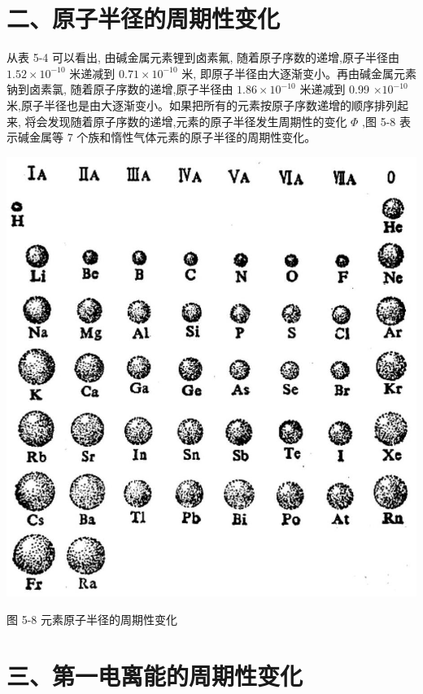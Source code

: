 \documentclass[10pt]{article}
\begin{document}
\section*{二、原子半径的周期性变化}

从表 5-4 可以看出, 由碱金属元素锂到卤素氟, 随着原子序数的递增,原子半径由 \({1.52} \times {10}^{-{10}}\) 米递减到 \({0.71} \times {10}^{-{10}}\) 米, 即原子半径由大逐渐变小。再由碱金属元素钠到卤素氯, 随着原子序数的递增,原子半径由 \({1.86} \times {10}^{-{10}}\) 米递减到 0.99 \(\times {10}^{-{10}}\) 米,原子半径也是由大逐渐变小。如果把所有的元素按原子序数递增的顺序排列起来, 将会发现随着原子序数的递增,元素的原子半径发生周期性的变化 \(\Phi\) ,图 5-8 表示碱金属等 7 个族和惰性气体元素的原子半径的周期性变化。

\begin{center}
\includegraphics[max width=1.0\textwidth]{images/01912d0f-097c-7e75-8f32-4f326cd86c9f_124_471112.jpg}
\end{center}

图 5-8 元素原子半径的周期性变化

\section*{三、第一电离能的周期性变化}
\end{document}
